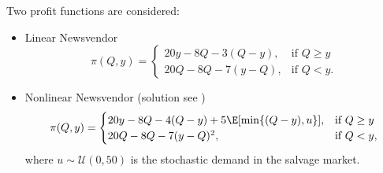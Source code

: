 Two profit functions are considered:
\begin{itemize}
    \item Linear Newsvendor
    \[
        \pi(Q,y)=
        \begin{cases}
            20y-8Q-3(Q-y),& \text{if } Q\geq y\\
            20Q-8Q-7(y-Q),& \text{if } Q< y.
        \end{cases}
    \]
    \item Nonlinear Newsvendor (solution see \cite{KK18})
    \[
        \pi(Q,y)=
        \begin{cases}
            20y-8Q-4(Q-y)+5\E[\min \{(Q-y),u\}],& \text{if } Q\geq y\\
            20Q-8Q-7(y-Q)^2,& \text{if } Q< y,
        \end{cases}
    \]
    where $u\sim \mathcal{U}(0,50)$ is the stochastic demand in the salvage market.
\end{itemize}